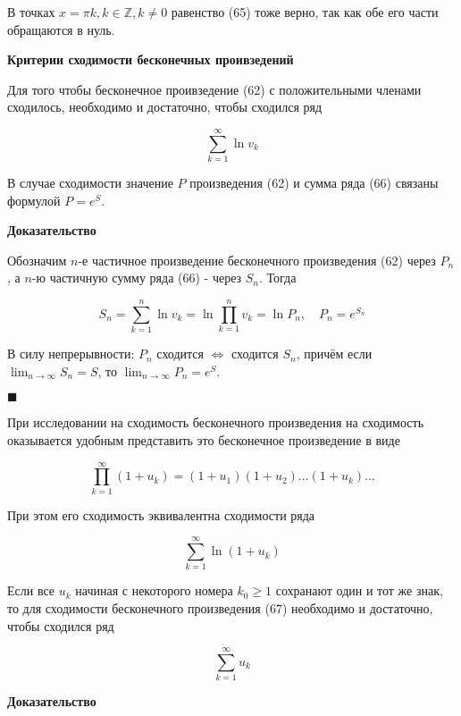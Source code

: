 В точках $x = \pi k, k \in \mathbb{Z}, k \neq 0$ равенство (65) тоже верно, так как обе его части обращаются в нуль.

\textbf{Критерии сходимости бесконечных проивзедений}

\begin{theorem}
	Для того чтобы бесконечное проивзедение (62) с положительными членами сходилось, необходимо и достаточно, чтобы сходился ряд
	
	\begin{equation}
		\displaystyle\sum_{k = 1}^\infty \ln v_k
	\end{equation}
	
	В случае сходимости значение $P$ произведения (62) и сумма ряда (66) связаны формулой $P = e^S$.
\end{theorem}
\textbf{Доказательство}

Обозначим $n$-е частичное произведение бесконечного произведения (62) через $P_n$, а $n$-ю частичную сумму ряда (66) - через $S_n$. Тогда

\begin{equation*}
	S_n = \displaystyle\sum_{k = 1}^n \ln v_k = \ln\displaystyle\prod_{k = 1}^n v_k = \ln P_n,\quad P_n = e^{S_n}
\end{equation*}

В силу непрерывности: $P_n$ сходится $\iff$ сходится $S_n$, причём если $\displaystyle\lim_{n \rightarrow \infty} S_n = S$, то $\displaystyle\lim_{n \rightarrow \infty} P_n = e^S$.

\begin{flushright}
	$\blacksquare$
\end{flushright}

При исследовании на сходимость бесконечного произведения на сходимость оказывается удобным представить это бесконечное произведение в виде

\begin{equation}
	\displaystyle\prod_{k = 1}^\infty (1 + u_k) = (1 + u_1)(1 + u_2)...(1 + u_k)...
\end{equation}

При этом его сходимость эквивалентна сходимости ряда

\begin{equation}
	\displaystyle\sum_{k = 1}^\infty \ln(1 + u_k)
\end{equation}

\begin{theorem}
	Если все $u_k$ начиная с некоторого номера $k_0 \geqslant 1$ сохранают один и тот же знак, то для сходимости бесконечного произведения (67) необходимо и достаточно, чтобы сходился ряд
	
	\begin{equation}
		\displaystyle\sum_{k = 1}^\infty u_k
	\end{equation}
\end{theorem}
\textbf{Доказательство}

